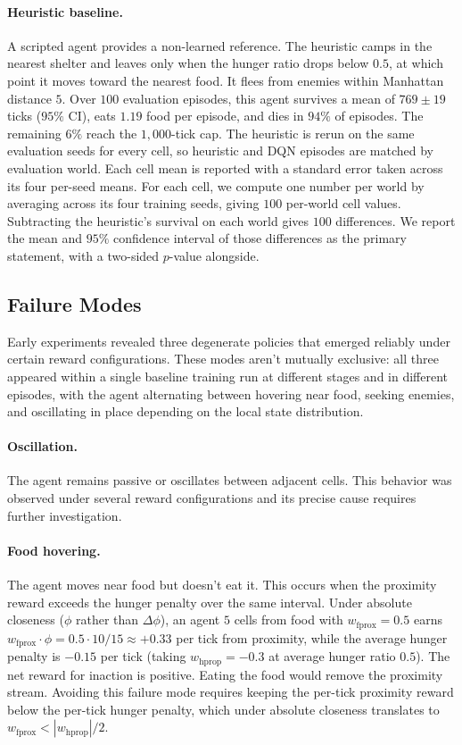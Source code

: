 \documentclass[12pt,a4paper,titlepage]{article}
\begin{document}
\paragraph{Heuristic baseline.} A scripted agent provides a non-learned reference. The heuristic camps in the nearest shelter and leaves only when the hunger ratio drops below $0.5$, at which point it moves toward the nearest food. It flees from enemies within Manhattan distance $5$. Over $100$ evaluation episodes, this agent survives a mean of $769 \pm 19$ ticks ($95\%$ CI), eats $1.19$ food per episode, and dies in $94\%$ of episodes. The remaining $6\%$ reach the $1{,}000$-tick cap. The heuristic is rerun on the same evaluation seeds for every cell, so heuristic and DQN episodes are matched by evaluation world. Each cell mean is reported with a standard error taken across its four per-seed means. For each cell, we compute one number per world by averaging across its four training seeds, giving $100$ per-world cell values. Subtracting the heuristic's survival on each world gives $100$ differences. We report the mean and $95\%$ confidence interval of those differences as the primary statement, with a two-sided $p$-value alongside.

\subsection{Failure Modes}
\label{sec:failure_modes}

Early experiments revealed three degenerate policies that emerged reliably under certain reward configurations. These modes aren't mutually exclusive: all three appeared within a single baseline training run at different stages and in different episodes, with the agent alternating between hovering near food, seeking enemies, and oscillating in place depending on the local state distribution.

\paragraph{Oscillation.} The agent remains passive or oscillates between adjacent cells. This behavior was observed under several reward configurations and its precise cause requires further investigation.

\paragraph{Food hovering.} The agent moves near food but doesn't eat it. This occurs when the proximity reward exceeds the hunger penalty over the same interval. Under absolute closeness ($\phi$ rather than $\Delta\phi$), an agent $5$ cells from food with $w_\text{fprox} = 0.5$ earns $w_\text{fprox} \cdot \phi = 0.5 \cdot 10/15 \approx +0.33$ per tick from proximity, while the average hunger penalty is $-0.15$ per tick (taking $w_\text{hprop} = -0.3$ at average hunger ratio $0.5$). The net reward for inaction is positive. Eating the food would remove the proximity stream. Avoiding this failure mode requires keeping the per-tick proximity reward below the per-tick hunger penalty, which under absolute closeness translates to $w_\text{fprox} < |w_\text{hprop}|/2$.
\end{document}
